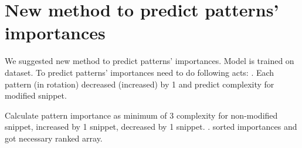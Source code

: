 \documentclass[12pt]{article}
\begin{document}
\section*{New method to predict patterns' importances}
We suggested new method to predict patterns' 
importances. Model is trained on dataset. 
\newline
To predict patterns' importances need to 
do following acts:
. Each pattern (in rotation) decreased
(increased) by 1 and predict complexity
for modified snippet. 

Calculate pattern importance as minimum of 
3 complexity for non-modified snippet,
increased by 1 snippet,
decreased by 1 snippet.
. sorted importances and 
got necessary ranked array.
\end{document}
